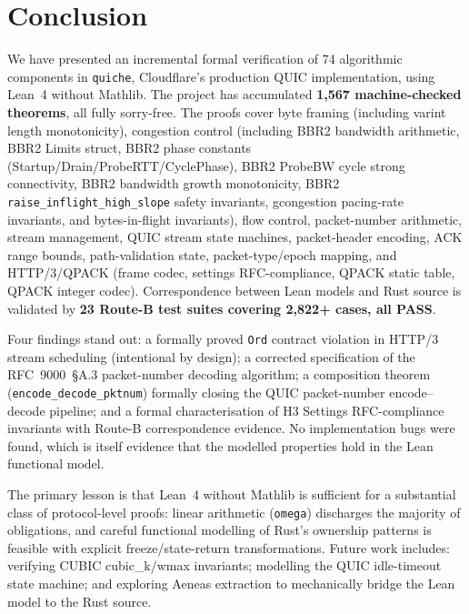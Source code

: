 \documentclass[sigconf,10pt]{acmart}
\begin{document}
\section{Conclusion}
\label{sec:conclusion}

We have presented an incremental formal verification of 74 algorithmic
components in \texttt{quiche}, Cloudflare's production QUIC implementation,
using Lean~4 without Mathlib.
The project has accumulated \textbf{1{,}567 machine-checked theorems}, all
fully sorry-free.
The proofs cover byte framing (including varint length monotonicity), congestion control
(including BBR2 bandwidth arithmetic, BBR2 Limits struct, BBR2 phase constants
(Startup/Drain/ProbeRTT/CyclePhase), BBR2 ProbeBW cycle strong connectivity,
BBR2 bandwidth growth monotonicity, BBR2 \texttt{raise\_inflight\_high\_slope}
safety invariants, gcongestion pacing-rate invariants, and
bytes-in-flight invariants), flow control, packet-number arithmetic, stream
management, QUIC stream state machines, packet-header encoding, ACK range
bounds, path-validation state, packet-type/epoch mapping, and HTTP/3/QPACK
(frame codec, settings RFC-compliance, QPACK static table, QPACK integer codec).
Correspondence between Lean models and Rust source is validated by
\textbf{23 Route-B test suites covering 2{,}822+ cases, all PASS}.

Four findings stand out: a formally proved \texttt{Ord} contract
violation in HTTP/3 stream scheduling (intentional by design); a corrected
specification of the RFC~9000~\S A.3 packet-number decoding algorithm;
a composition theorem (\texttt{encode\_decode\_pktnum}) formally closing the
QUIC packet-number encode--decode pipeline; and a formal characterisation
of H3 Settings RFC-compliance invariants with Route-B correspondence evidence.
No implementation bugs were found, which is itself evidence that the
modelled properties hold in the Lean functional model.

The primary lesson is that Lean~4 without Mathlib is sufficient for
a substantial class of protocol-level proofs: linear arithmetic
(\texttt{omega}) discharges the majority of obligations, and careful
functional modelling of Rust's ownership patterns is feasible with
explicit freeze/state-return transformations.
Future work includes: verifying CUBIC cubic\_k/wmax invariants; modelling
the QUIC idle-timeout state machine; and exploring Aeneas extraction to
mechanically bridge the Lean model to the Rust source.



\end{document}
